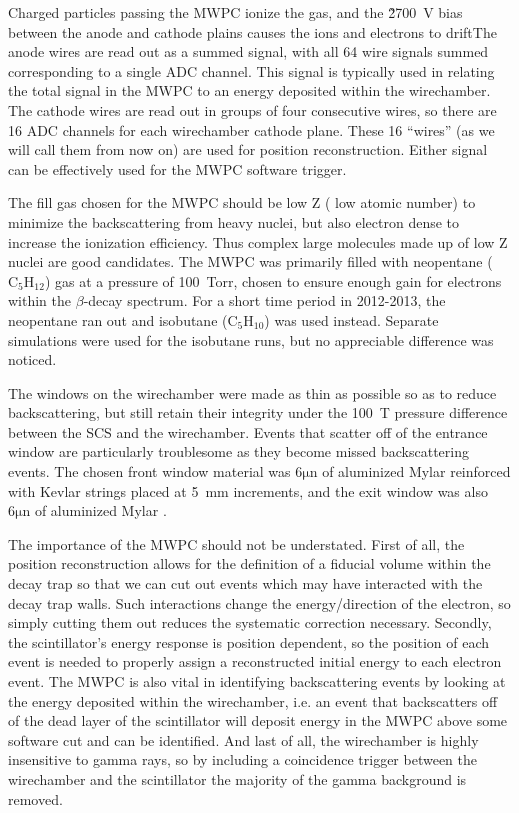 Charged particles passing the MWPC ionize the gas, and the \~2700~V bias between the anode and
cathode plains causes the ions and electrons to driftThe anode wires are read out as a summed signal, with all 64 wire signals summed corresponding to
a single ADC channel. This signal is typically used in relating the total signal in the MWPC
to an energy deposited within the wirechamber. The cathode wires are read out in groups of four
consecutive wires, so there are 16 ADC channels for each wirechamber cathode plane. These 16
``wires'' (as we will call them from now on) are used for position reconstruction. Either
signal can be effectively used for the MWPC software trigger.

The fill
gas chosen for the MWPC should be low Z ( low atomic number) to minimize the backscattering from heavy nuclei,
but also electron dense to increase the ionization efficiency. Thus complex large molecules
made up of low Z nuclei are good candidates.
The MWPC was primarily filled with neopentane ($\mathrm{C}_5\mathrm{H}_{12}$) gas at a pressure of
100~Torr, chosen to ensure enough gain for electrons within the $\beta$-decay spectrum. For a
short time period in 2012-2013, the neopentane ran out and isobutane ($\mathrm{C}_5\mathrm{H}_{10}$)
was used instead. Separate simulations were used for the isobutane runs, but no appreciable
difference was noticed.

The windows on the wirechamber were made as thin as possible so as to reduce backscattering, but still
retain their integrity under the 100~T pressure difference between the SCS and the wirechamber. Events that
scatter off of the entrance window are particularly troublesome as they become missed backscattering events.
The chosen front window material was $6\mathrm{ \mu{n}}$ of aluminized Mylar reinforced with Kevlar strings
placed at 5~mm increments, and the exit window was also $6\mathrm{ \mu{n}}$ of aluminized Mylar \cite{mpmThesis}. 

The importance of the MWPC should not be understated. First of all, the position reconstruction allows for the
definition of a fiducial volume within the decay trap so that we can cut out events which may have interacted
with the decay trap walls. Such interactions change the energy/direction of the electron, so simply cutting them
out reduces the systematic correction necessary. Secondly, the scintillator's energy response is position
dependent, so the position of each event is needed to properly assign a reconstructed initial energy to
each electron event. The MWPC is also vital in identifying backscattering events by looking at the energy
deposited within the wirechamber, i.e. an event that backscatters off of the dead layer of the scintillator
will deposit energy in the MWPC above some software cut and can be identified. And last of all,
the wirechamber is highly insensitive to gamma rays, so by including a coincidence trigger between the wirechamber
and the scintillator the majority of the gamma background is removed.

